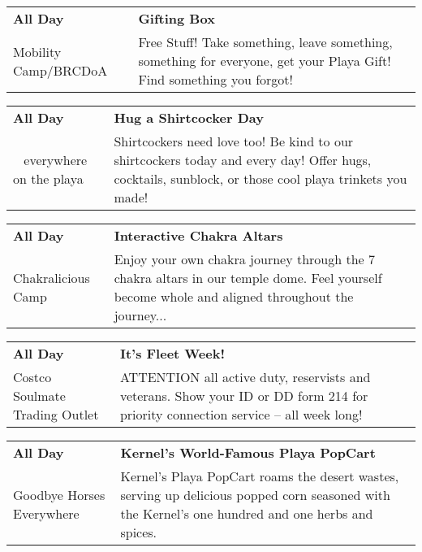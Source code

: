 \begin{tabular}{ p{1in} p{2.2in} }
    \textbf{All Day} & \textbf{Gifting Box} \\
    Mobility Camp/BRCDoA \newline  & Free Stuff! Take something, leave something, something for everyone, get your Playa Gift! Find something you forgot! \\
    \hline 
\end{tabular}
    
\begin{tabular}{ p{1in} p{2.2in} }
    \textbf{All Day} & \textbf{Hug a Shirtcocker Day} \\
    ~ \newline everywhere on the playa & Shirtcockers need love too! Be kind to our shirtcockers today and every day! Offer hugs, cocktails, sunblock, or those cool playa trinkets you made! \\
    \hline 
\end{tabular}
    
\begin{tabular}{ p{1in} p{2.2in} }
    \textbf{All Day} & \textbf{Interactive Chakra Altars} \\
    Chakralicious Camp \newline  & Enjoy your own chakra journey through the 7 chakra altars in our temple dome. Feel yourself become whole and aligned throughout the journey... \\
    \hline 
\end{tabular}
    
\begin{tabular}{ p{1in} p{2.2in} }
    \textbf{All Day} & \textbf{It's Fleet Week!} \\
    Costco Soulmate Trading Outlet \newline  & ATTENTION all active duty, reservists and veterans. Show your ID or DD form 214 for priority connection service -- all week long! \\
    \hline 
\end{tabular}
    
\begin{tabular}{ p{1in} p{2.2in} }
    \textbf{All Day} & \textbf{Kernel's World-Famous Playa PopCart} \\
    Goodbye Horses \newline Everywhere & Kernel's Playa PopCart roams the desert wastes, serving up delicious popped corn seasoned with the Kernel's one hundred and one herbs and spices. \\
    \hline 
\end{tabular}
    
